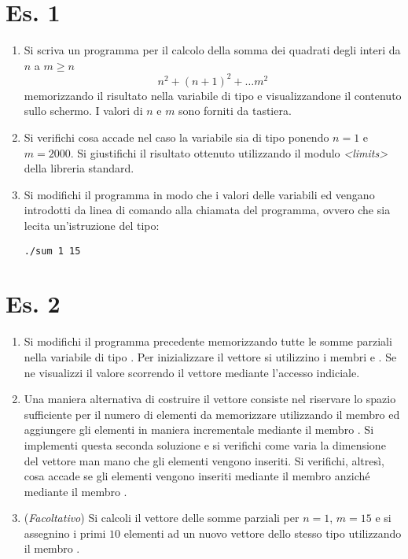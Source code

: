 \section*{Es. 1}
\begin{enumerate}
\item Si scriva un programma per il calcolo della somma dei quadrati
  degli interi da $n$ a $m\ge n$ 
\begin{equation*}
n^2 + \left(n+1\right)^2 + \ldots m^2
\end{equation*}
memorizzando il risultato nella variabile  di tipo
 e visualizzandone il contenuto sullo schermo. I valori di
$n$ e $m$ sono forniti da tastiera. 
\item Si verifichi cosa accade nel caso la variabile  sia di
  tipo  ponendo $n=1$ e $m=2000$. Si giustifichi il risultato
  ottenuto utilizzando il modulo \emph{<limits>} della libreria
  standard. 
\item Si modifichi il programma in modo che i valori delle variabili
   ed  vengano introdotti da linea di comando alla
  chiamata del programma, ovvero che sia lecita un'istruzione del
  tipo: 
\begin{verbatim}
./sum 1 15
\end{verbatim}
\end{enumerate}

\section*{Es. 2}
\begin{enumerate}
\item Si modifichi il programma precedente memorizzando tutte le somme
  parziali nella variabile  di tipo
  . Per inizializzare il vettore si
  utilizzino i membri  e . Se ne
  visualizzi il valore scorrendo il vettore mediante l'accesso
  indiciale. 
\item Una maniera alternativa di costruire il vettore 
  consiste nel riservare lo spazio sufficiente per il numero di
  elementi da memorizzare utilizzando il membro  ed
  aggiungere gli elementi in maniera incrementale mediante il membro
  . Si implementi questa seconda soluzione e si
  verifichi come varia la dimensione del vettore man mano che gli
  elementi vengono inseriti. Si verifichi, altres\`i, cosa accade se
  gli elementi vengono inseriti mediante il membro 
  anzich\'e mediante il membro . 
\item (\emph{Facoltativo}) Si calcoli il vettore delle somme parziali
  per $n=1$, $m=15$ e si assegnino i primi $10$ elementi ad un nuovo
  vettore  dello stesso tipo utilizzando il membro
  . 
\end{enumerate}
